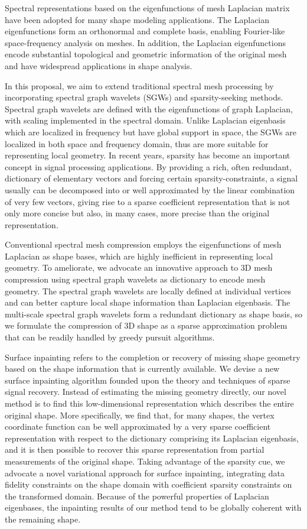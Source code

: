 Spectral representations based on the eigenfunctions of mesh Laplacian matrix
have been adopted for many shape modeling applications.
The Laplacian eigenfunctions form an orthonormal and complete basis,
enabling Fourier-like space-frequency analysis on meshes. In addition,
the Laplacian eigenfunctions encode substantial topological and geometric
information of the original mesh and have widespread applications in shape analysis.

In this proposal, we aim to extend traditional spectral mesh processing
by incorporating spectral graph wavelets (SGWs) and sparsity-seeking methods. Spectral graph
wavelets are defined with the eigenfunctions of graph Laplacian, with scaling
implemented in the spectral domain. Unlike Laplacian eigenbasis which are
localized in frequency but have global support in space, the SGWs are localized
in both space and frequency domain, thus are more suitable for representing
local geometry. In recent years, sparsity has become an important concept in
signal processing applications. By providing a rich, often redundant, dictionary
of elementary vectors and forcing certain sparsity-constraints, a signal usually
can be decomposed into or well approximated by the linear combination of very
few vectors, giving rise to a sparse coefficient representation that is not only
more concise but also, in many cases, more precise than the original representation.


Conventional spectral mesh compression employs the eigenfunctions of
mesh Laplacian as shape bases, which are highly inefficient
in representing local geometry. To ameliorate, we advocate an
innovative approach to 3D mesh compression using spectral graph
wavelets as dictionary to encode mesh geometry. The spectral graph wavelets are locally
defined at individual vertices and can better capture local shape
information than Laplacian eigenbasis. The multi-scale
spectral graph wavelets form a redundant dictionary as shape basis,
so we formulate the compression of 3D shape as a sparse
approximation problem that can be readily handled by greedy pursuit algorithms.

Surface inpainting refers to the completion or recovery of missing shape geometry
based on the shape information that is currently available. We devise a new surface
inpainting algorithm founded upon the theory and techniques of sparse signal recovery.
Instead of estimating the missing geometry directly, our novel method is to
find this low-dimensional representation which describes the entire
original shape. More specifically, we find that, for many shapes, the
vertex coordinate function can be well approximated by a very sparse coefficient
representation with respect to the dictionary comprising its
Laplacian eigenbasis, and it is then possible to recover this sparse
representation from partial measurements of the original shape.
Taking advantage of the sparsity cue, we advocate a novel
variational approach for surface inpainting, integrating data
fidelity constraints on the shape domain with coefficient sparsity
constraints on the transformed domain. Because of the powerful
properties of Laplacian eigenbases, the inpainting results of our
method tend to be globally coherent with the remaining shape.

